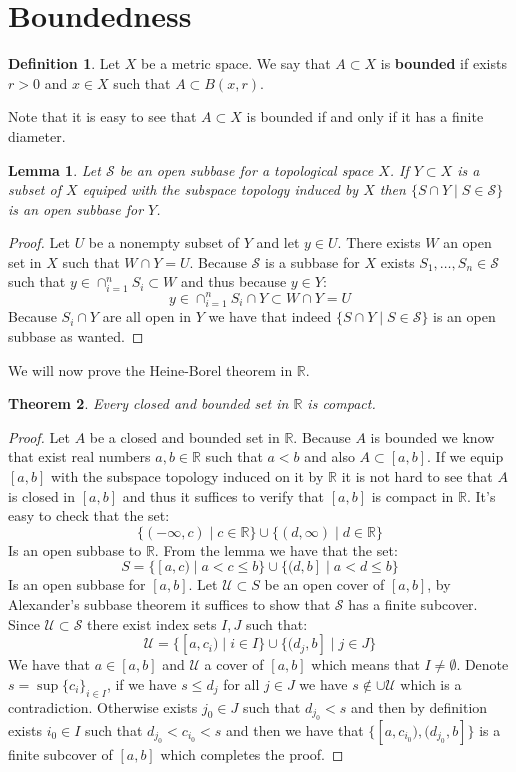 \documentclass[11pt,a4paper]{article}
\theoremstyle{definition}
\newtheorem{definition}{Definition}[section]
\theoremstyle{plain}
\newtheorem{theorem}{Theorem}[section]
\newtheorem{lemma}[theorem]{Lemma}
\newcommand{\R}{\mathbb{R}}
\begin{document}
	\section{Boundedness}
	\begin{definition}
		Let $X$ be a metric space. We say that $A \subset X$ is 
		\textbf{bounded} if exists $r > 0$ and $x \in X$ such that
		$A \subset B(x,r)$.
	\end{definition}
	Note that it is easy to see that $A \subset X$ is bounded if and only
	if it has a finite diameter.
	\begin{lemma}
		Let $\mathcal{S}$ be an open subbase for a topological space $X$.
		If $Y \subset X$ is a subset of $X$ equiped with the subspace
		topology induced by $X$ then $\{S \cap Y \mid S \in \mathcal{S}\}$
		is an open subbase for $Y$.
	\end{lemma}
	\begin{proof}
		Let $U$ be a nonempty subset of $Y$ and let $y \in U$. There
		exists $W$ an open set in $X$ such that $W \cap Y = U$. Because
		$\mathcal{S}$ is a subbase for $X$ exists 
		$S_1,\dots,S_n \in \mathcal{S}$ such that 
		$y \in \cap_{i=1}^{n}{S_i} \subset W$ and thus because $y \in Y$:
		\[
			y \in \cap_{i=1}^{n}{S_i \cap Y} \subset W \cap Y = U
		\]
		Because $S_i \cap Y$ are all open in $Y$ we have that indeed
		$\{S \cap Y \mid S \in \mathcal{S}\}$ is an open subbase as wanted.
	\end{proof}
	We will now prove the Heine-Borel theorem in $\R$.
	\begin{theorem}
		Every closed and bounded set in $\R$ is compact.
	\end{theorem}
	\begin{proof}
		Let $A$ be a closed and bounded set in $\R$. Because $A$ is bounded
		we know that exist real numbers $a,b \in \R$ such that $a < b$ and
		also $A \subset [a,b]$. If we equip $[a,b]$ with the subspace
		topology induced on it by $\R$ it is not hard to see that $A$ is
		closed in $[a,b]$ and thus it suffices to verify that $[a,b]$
		is compact in $\R$. It's easy to check that the set:
		\[
			\{(-\infty, c) \mid c \in \R\} \cup 
			\{(d, \infty) \mid d \in \R\}
		\]
		Is an open subbase to $\R$. From the lemma we have that the set:
		\[
			S = \{[a, c) \mid a < c \le b\} \cup 
			\{(d, b] \mid a < d \le b\}
		\]
		Is an open subbase for $[a,b]$. Let $\mathcal{U} \subset S$ be an
		open cover of $[a,b]$, by Alexander's subbase theorem it suffices
		to show that $\mathcal{S}$ has a finite subcover. Since 
		$\mathcal{U} \subset \mathcal{S}$ there exist index sets $I,J$ such 
		that:
		\[
			\mathcal{U} = 
			\{[a,c_i) \mid i \in I\} \cup \{(d_j,b] \mid j \in J\}
		\]
		We have that $a \in [a,b]$ and $\mathcal{U}$ a cover of $[a,b]$
		which means that $I \neq \emptyset$. 
		Denote $s = \sup\{c_i\}_{i\in I}$,  if we have $s \le d_j$ for
		all $j \in J$ we have $s \notin \cup\mathcal{U}$ which is a 
		contradiction. Otherwise exists $j_0 \in J$ such that 
		$d_{j_0} < s$ and then by definition exists $i_0 \in I$ such that
		$d_{j_0} < c_{i_0} < s$ and then we have that 
		$\{[a,c_{i_0}), (d_{j_0},b]\}$ is a finite subcover of $[a,b]$ which
		completes the proof.
	\end{proof}
	
\end{document}
